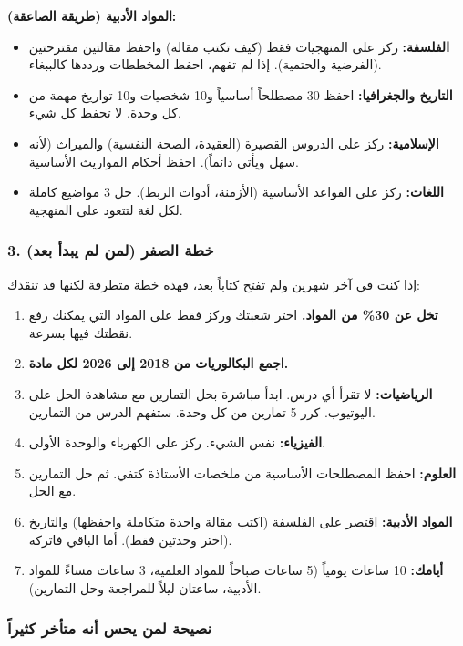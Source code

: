 \documentclass[12pt,a4paper]{book}
\begin{document}
	\textbf{المواد الأدبية (طريقة الصاعقة):}
	\begin{itemize}
		\item \textbf{الفلسفة:} ركز على المنهجيات فقط (كيف تكتب مقالة) واحفظ مقالتين مقترحتين (الفرضية والحتمية). إذا لم تفهم، احفظ المخططات ورددها كالببغاء.
		\item \textbf{التاريخ والجغرافيا:} احفظ 30 مصطلحاً أساسياً و10 شخصيات و10 تواريخ مهمة من كل وحدة. لا تحفظ كل شيء.
		\item \textbf{الإسلامية:} ركز على الدروس القصيرة (العقيدة، الصحة النفسية) والميراث (لأنه سهل ويأتي دائماً). احفظ أحكام المواريث الأساسية.
		\item \textbf{اللغات:} ركز على القواعد الأساسية (الأزمنة، أدوات الربط). حل 3 مواضيع كاملة لكل لغة لتتعود على المنهجية.
	\end{itemize}
	
	\subsubsection*{3. خطة الصفر (لمن لم يبدأ بعد)}
	     \label{sec:psy-late-start-success1}
	إذا كنت في آخر شهرين ولم تفتح كتاباً بعد، فهذه خطة متطرفة لكنها قد تنقذك:
	
	\begin{enumerate}
		\item \textbf{تخل عن 30\% من المواد.} اختر شعبتك وركز فقط على المواد التي يمكنك رفع نقطتك فيها بسرعة.
		\item \textbf{اجمع البكالوريات من 2018 إلى 2026 لكل مادة.}
		\item \textbf{الرياضيات:} لا تقرأ أي درس. ابدأ مباشرة بحل التمارين مع مشاهدة الحل على اليوتيوب. كرر 5 تمارين من كل وحدة. ستفهم الدرس من التمارين.
		\item \textbf{الفيزياء:} نفس الشيء. ركز على الكهرباء والوحدة الأولى.
		\item \textbf{العلوم:} احفظ المصطلحات الأساسية من ملخصات الأستاذة كتفي. ثم حل التمارين مع الحل.
		\item \textbf{المواد الأدبية:} اقتصر على الفلسفة (اكتب مقالة واحدة متكاملة واحفظها) والتاريخ (اختر وحدتين فقط). أما الباقي فاتركه.
		\item \textbf{أيامك:} 10 ساعات يومياً (5 ساعات صباحاً للمواد العلمية، 3 ساعات مساءً للمواد الأدبية، ساعتان ليلاً للمراجعة وحل التمارين).
	\end{enumerate}
	

	
	\subsubsection*{نصيحة لمن يحس أنه متأخر كثيراً}
	
\end{document}
